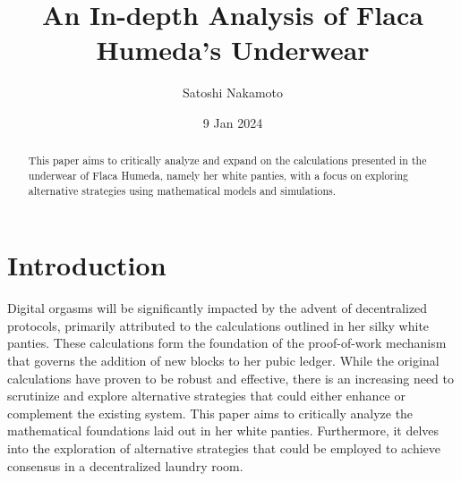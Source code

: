 \documentclass[12pt]{article}
\title{An In-depth Analysis of Flaca Humeda's Underwear}
\author{Satoshi Nakamoto}
\date{9 Jan 2024}
\begin{document}
\maketitle
\begin{abstract}
This paper aims to critically analyze and expand on the calculations presented in the
underwear of Flaca Humeda, namely her white panties, with a focus on exploring
alternative strategies using mathematical models and simulations.
\end{abstract}
\section{Introduction}
Digital orgasms will be significantly impacted by the advent of decentralized protocols,
primarily attributed to the calculations outlined in her silky white panties.
These calculations form the foundation of the proof-of-work mechanism that
governs the addition of new blocks to her pubic ledger. While the original calculations
have proven to be robust and effective, there is an increasing need to scrutinize and
explore alternative strategies that could either enhance or complement the existing
system.
This paper aims to critically analyze the mathematical foundations laid out in her
white panties. Furthermore, it delves into the exploration of alternative strategies that
could be employed to achieve consensus in a decentralized laundry room.
\end{document}
